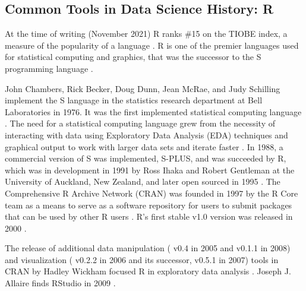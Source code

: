 \documentclass[010-intro.tex]{subfiles}
\begin{document}
    \subsection{Common Tools in Data Science History: R}
    \label{ss:intro-r-history}
    
        At the time of writing (November 2021) R ranks \#15 on the TIOBE index,
        a measure of the popularity of a language
        \cite{IndexTIOBESoftware}.
        R is one of the premier languages used for statistical computing and graphics,
        that was the successor to the S programming language
        \cite{ProjectStatisticalComputing}.

        John Chambers, Rick Becker, Doug Dunn, Jean McRae, and Judy Schilling
        implement the S language in the statistics research department at Bell Laboratories in 1976.
        It was the first implemented statistical computing language
        \cite{beckerBriefHistory1994}.
        The need for a statistical computing language grew from the necessity of
        interacting with data using Exploratory Data Analysis (EDA)
        techniques and graphical output
        to work with larger data sets and iterate faster
        \cite{beckerBriefHistory1994}.
        In 1988, a commercial version of S was implemented, S-PLUS, and was
        succeeded by R, which was in development in 1991 by
        Ross Ihaka and Robert Gentleman at the University of Auckland, New Zealand,
        and later open sourced in 1995
        \cite{beckerBriefHistory1994}.
        The Comprehensive R Archive Network (CRAN) was founded in 1997 by the R Core team
        as a means to serve as a software repository for users to submit packages that can be
        used by other R users
        \cite{hornikAnnounceCRAN1997}.
        R's first stable v1.0 version was released in 2000
        \cite{smith16YearsProject2016, ihakaProjectBriefHistory}.

        The release of additional
        data manipulation
        ( v0.4 in 2005 and  v0.1.1 in 2008)
        and visualization
        ( v0.2.2 in 2006 and its successor,  v0.5.1 in 2007)
        tools in CRAN by Hadley Wickham
        focused R in exploratory data analysis
        \cite{wickhamPracticalToolsExploring2008, tukeyExploratoryDataAnalysis1977}.
        Joseph J. Allaire finds RStudio in 2009
        \cite{allaireRStudioPBC2020, rstudioRStudio}.
\end{document}
